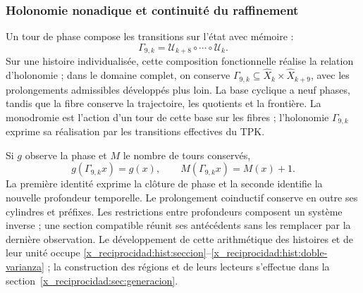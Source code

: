 \subsubsection{Holonomie nonadique et continuité du raffinement}
\label{x_reciprocidad:tpk-int:holonomia}

Un tour de phase compose les transitions sur l'état avec mémoire :
\begin{equation}
 \Gamma_{9,k}=\mathcal U_{k+8}\circ\cdots\circ\mathcal U_k.
 \label{x_reciprocidad:tpk-int:gamma}
\end{equation}
Sur une histoire individualisée, cette composition fonctionnelle réalise la relation d'holonomie ; dans le domaine complet, on conserve \(\Gamma_{9,k}\subseteq\widehat X_k\times\widehat X_{k+9}\), avec les prolongements admissibles développés plus loin. La base cyclique a neuf phases, tandis que la fibre conserve la trajectoire, les quotients et la frontière. La monodromie est l'action d'un tour de cette base sur les fibres ; l'holonomie \(\Gamma_{9,k}\) exprime sa réalisation par les transitions effectives du TPK.

Si \(g\) observe la phase et \(M\) le nombre de tours conservés,
\[
 g(\Gamma_{9,k}x)=g(x),\qquad M(\Gamma_{9,k}x)=M(x)+1.
\]
La première identité exprime la clôture de phase et la seconde identifie
la nouvelle profondeur temporelle. Le prolongement coinductif conserve
en outre ses cylindres et préfixes. Les restrictions entre profondeurs
composent un système inverse ; une section compatible réunit ses
antécédents sans les remplacer par la dernière observation. Le développement
de cette arithmétique des histoires et de leur unité occupe
\ref{x_reciprocidad:hist:seccion}--\ref{x_reciprocidad:hist:doble-varianza} ; la construction des
régions et de leurs lecteurs s'effectue dans la section~\ref{x_reciprocidad:sec:generacion}.

